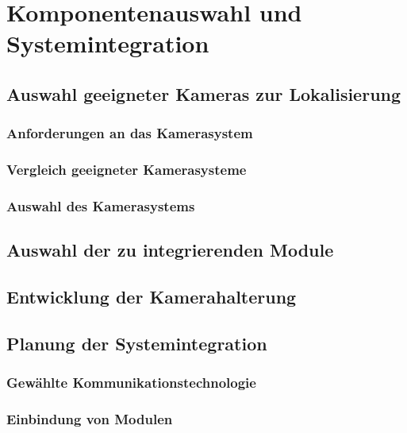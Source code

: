 \cleardoublepage
\chapter{Komponentenauswahl und Systemintegration}
\label{ch:Konzept}

\section{Auswahl geeigneter Kameras zur Lokalisierung}
\label{sec:Auswahl geeigneter Kameras zur Lokalisierung}

\subsection{Anforderungen an das Kamerasystem}

\subsection{Vergleich geeigneter Kamerasysteme}

\subsection{Auswahl des Kamerasystems}

\section{Auswahl der zu integrierenden Module}
\label{sec:Auswahl der zu integrierenden Module}

\section{Entwicklung der Kamerahalterung}
\label{sec:Entwicklung der Kamerahalterung}

\section{Planung der Systemintegration}
\label{sec:Planung der Systemintegration}

\subsection{Gewählte Kommunikationstechnologie}

\subsection{Einbindung von Modulen}

